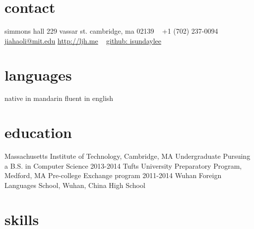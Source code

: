 \documentclass[]{friggeri-cv} %
\begin{document}


\begin{aside} %
\section{contact}
simmons hall
229 vassar st.
cambridge, ma 02139
~
+1 (702) 237-0094
~
\href{mailto:jiahaoli@mit.edu}{jiahaoli@mit.edu}
\href{http://ljh.me}{http://ljh.me}
~
\href{http://github.com/isundaylee}{github: isundaylee}
\section{languages}
native in mandarin
fluent in english
\end{aside}


\section{education}

\begin{entrylist}
{Massachusetts Institute of Technology, Cambridge, MA}
{Undergraduate}
{Pursuing a B.S. in Computer Science}
\entry
{2013-2014}
{Tufts University Preparatory Program, Medford, MA}
{Pre-college}
{Exchange program}
\entry
{2011-2014}
{Wuhan Foreign Languages School, Wuhan, China}
{High School}
{}
\end{entrylist}


\section{skills}
\end{document}

